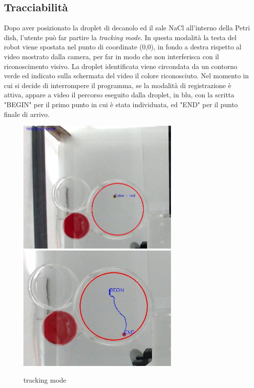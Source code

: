 \subsection{Tracciabilità}
\label{sec:123}
Dopo aver posizionato la droplet di decanolo ed il sale NaCl all'interno della Petri dish, l'utente può far partire la \emph{tracking mode}. In questa modalità la testa del robot viene spostata nel punto di coordinate (0,0), in fondo a destra rispetto al video mostrato dalla camera, per far in modo che non interferisca con il riconoscimento visivo. 
La droplet identificata viene circondata da un contorno verde ed indicato sulla schermata del video il colore riconosciuto. Nel momento in cui si decide di interrompere il programma, se la modalità di registrazione è attiva, appare a video il percorso eseguito dalla droplet, in blu, con la scritta "BEGIN" per il primo punto in cui è stata individuata, ed "END" per il punto finale di arrivo.   
\begin{figure}[h]
	\centering
   		{\includegraphics[width=8cm]{immagini/track.jpg}}
 	\hspace{2mm}   	
		{\includegraphics[width=8cm]{immagini/track_path.jpg}}
	\caption{tracking mode}
\end{figure}
\pagebreak
